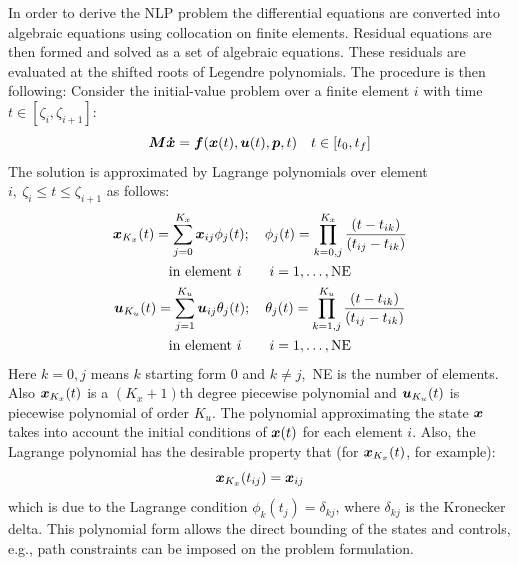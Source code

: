 In order to derive the NLP problem the differential equations are
converted into algebraic equations using collocation on finite
elements. Residual equations are then formed and solved as a set of
algebraic equations. These residuals are evaluated at the shifted
roots of Legendre polynomials. The procedure is then following:
Consider the initial-value problem over a finite element $i$ with time 
$t\in[\zeta_{i},\zeta_{i+1}]$:
\begin{equation}
\ve{M\dot{x}} = \ve{f}(\ve{x}(t),\ve{u}(t),\ve{p},t) \quad
t\in[t_{0},t_{f}]  
\end{equation}
The solution is approximated by Lagrange polynomials
over element $i,~\zeta_{i}\leq t\leq \zeta_{i+1}$ as follows: 
\begin{gather}
\ve{x}_{K_{x}}(t) = \sum_{j=0}^{K_{x}}\ve{x}_{ij}\phi_{j}(t); \quad
\phi_{j}(t) = \prod_{k=0,j}^{K_{x}}\frac{(t-t_{ik})}{(t_{ij}-t_{ik})}\\
\textrm{in element}~i\qquad i=1,\ldots,\textrm{NE}\nonumber\\  
\ve{u}_{K_{u}}(t) = \sum_{j=1}^{K_{u}}\ve{u}_{ij}\theta_{j}(t); \quad
{\theta_{j}}(t) = \prod_{k=1,j}^{K_{u}}\frac{(t-t_{ik})}{(t_{ij}-t_{ik})}\\
\textrm{in element}~i\qquad i=1,\ldots,\textrm{NE}\nonumber 
\end{gather}
Here $k=0,j$ means $k$ starting form 0 and $k\ne
j$,~\textrm{NE} is the number of elements. Also $\ve{x}_{K_{x}}(t)$ is
a $(K_{x}+1)$th degree piecewise polynomial and $\ve{u}_{K_{u}}(t)$ is
piecewise polynomial of order $K_{u}$. The polynomial approximating
the state $\ve{x}$ takes into account the initial conditions of
$\ve{x}(t)$ for each element $i$. Also, the Lagrange polynomial has the
desirable property that (for $\ve{x}_{K_{x}}(t)$, for example): 
\begin{equation}
\ve{x}_{K_{x}}(t_{ij}) = \ve{x}_{ij}
\end{equation}
which is due to the Lagrange condition
$\phi_{k}(t_{j}) = \delta_{kj}$, where $\delta_{kj}$ is the Kronecker
delta. This polynomial form allows the direct bounding of the states
and controls, e.g., path constraints can be imposed on the problem
formulation.  

